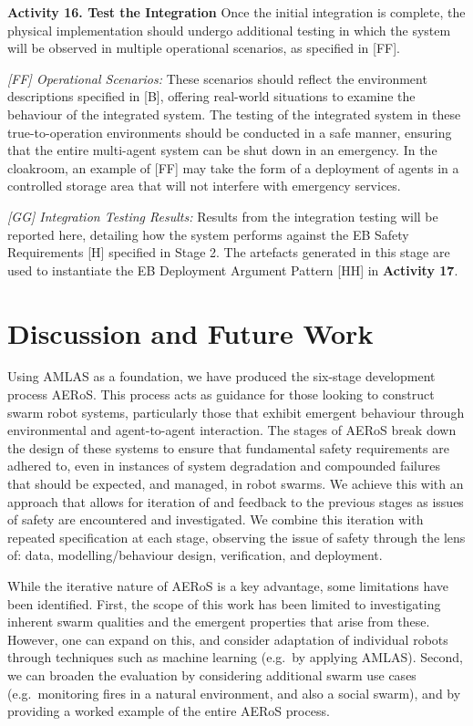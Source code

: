 \documentclass{article}
\begin{document}
\noindent\textbf{Activity 16. Test the Integration} Once the initial integration is complete, the physical implementation should undergo additional testing in which the system will be observed in multiple operational scenarios, as specified in [FF].

\emph{[FF] Operational Scenarios:} These scenarios should reflect the environment descriptions specified in [B], offering real-world situations to examine the behaviour of the integrated system. The testing of the integrated system in these true-to-operation environments should be conducted in a safe manner, ensuring that the entire multi-agent system can be shut down in an emergency. 
In the cloakroom, an example of [FF] may take the form of a deployment of agents in a controlled storage area that will not interfere with emergency services.

\emph{[GG] Integration Testing Results:} Results from the integration testing will be reported here, detailing how the system performs against the EB Safety Requirements [H] specified in Stage 2. 
The artefacts generated in this stage are used to instantiate the EB Deployment Argument Pattern [HH] in \textbf{Activity 17}.
\section{Discussion and Future Work} \label{discussion-conclusions}
Using AMLAS \cite{Hawkins2021} as a foundation, we have produced the six-stage development process AERoS. This process acts as guidance for those looking to construct swarm robot systems, particularly those that exhibit emergent behaviour through environmental and agent-to-agent interaction. The stages of AERoS break down the design of these systems to ensure that fundamental safety requirements are adhered to, even in instances of system degradation and compounded failures that should be expected, and managed, in robot swarms. We achieve this with an approach that allows for iteration of and feedback to the previous stages as issues of safety are encountered and investigated. We combine this iteration with repeated specification at each stage, observing the issue of safety through the lens of: data, modelling/behaviour design, verification, and deployment. 

While the iterative nature of AERoS is a key advantage, some limitations have been identified. 
First, the scope of this work has been limited to investigating inherent swarm qualities and the emergent properties that arise from these. 
However, one can expand on this, and consider adaptation of individual robots through techniques such as machine learning (e.g.\ by applying AMLAS).
Second, we can broaden the evaluation by considering additional swarm use cases (e.g.\ monitoring fires in a natural environment, and also a social swarm), and by providing a worked example of the entire AERoS process.
\end{document}
